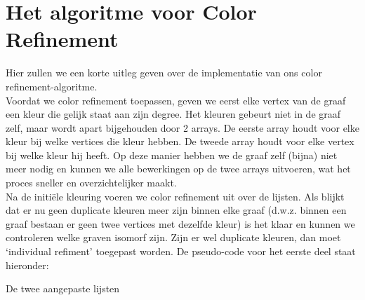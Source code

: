 \documentclass{article}
\begin{document}

\section{Het algoritme voor Color Refinement}
Hier zullen we een korte uitleg geven over de implementatie van ons color refinement-algoritme.\\



Voordat we color refinement toepassen, geven we eerst elke vertex van de graaf een kleur die gelijk staat aan zijn degree. Het kleuren gebeurt niet in de graaf zelf, maar wordt apart bijgehouden door 2 arrays. De eerste array houdt voor elke kleur bij welke vertices die kleur hebben. De tweede array houdt voor elke vertex bij welke kleur hij heeft. Op deze manier hebben we de graaf zelf (bijna) niet meer nodig en kunnen we alle bewerkingen op de twee arrays uitvoeren, wat het proces sneller en overzichtelijker maakt.\\
Na de initi\"ele kleuring voeren we color refinement uit over de lijsten. Als blijkt dat er nu geen duplicate kleuren meer zijn binnen elke graaf (d.w.z. binnen een graaf bestaan er geen twee vertices met dezelfde kleur) is het klaar en kunnen we controleren welke graven isomorf zijn. Zijn er wel duplicate kleuren, dan moet `individual refiment' toegepast worden. De pseudo-code voor het eerste deel staat hieronder:\\

\begin{algorithm}[H]
	\Return De twee aangepaste lijsten
\end{algorithm}
\vspace{5mm}
\end{document}
